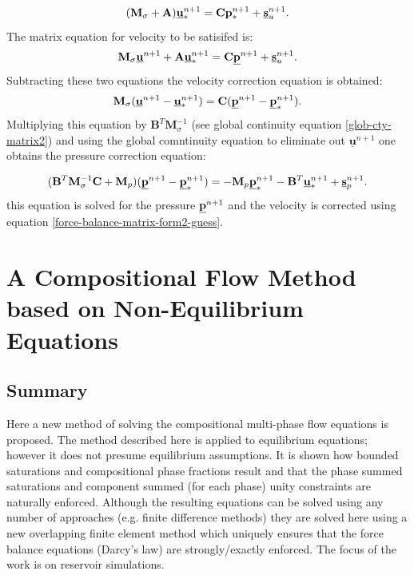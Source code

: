 \begin{equation}
({\mathbf M}_\sigma +{\mathbf A}) \underline{\bf u}^{n+1}_* = {\mathbf C} {\bf p}^{n+1}_* + \underline{\bf s}_u^{n+1}. 
\label{force-balance-matrix-form2-guess}
\end{equation}
The matrix equation for velocity to be satisifed is: 
\begin{equation}
{\mathbf M}_\sigma\underline{\bf u}^{n+1} +{\mathbf A} \underline{\bf u}^{n+1}_* = {\mathbf C} \underline{\bf p}^{n+1} + \underline{\bf s}_u^{n+1}. 
\label{force-balance-matrix-form2-guess-2}
\end{equation}
Subtracting these two equations the   
velocity correction equation is obtained:
\begin{equation}
{\mathbf M}_\sigma ( \underline{\bf u}^{n+1} -\underline{\bf u}^{n+1}_*) 
= {\mathbf C} (\underline{\bf p}^{n+1} - \underline{\bf p}^{n+1}_*). 
\label{force-balance-matrix-form2-guess}
\end{equation}
Multiplying this equation by ${\mathbf B}^T {\mathbf M}_\sigma^{-1}$ 
(see global continuity 
equation \ref{glob-cty-matrix2}) and using the global comntinuity 
equation to eliminate out $ \underline{\mathbf u}^{n+1} $ one obtains 
the pressure correction equation:

\begin{equation}
({\mathbf B}^T {\mathbf M}_\sigma^{-1} {\mathbf C} + {\mathbf M}_p) (\underline{\bf p}^{n+1} - \underline{\bf p}^{n+1}_*) 
= - {\mathbf M}_p \underline{\bf p}^{n+1}_* - {\mathbf B}^T \underline{\bf u}^{n+1}_* + \underline{\bf s}_p^{n+1}.
\end{equation}
this equation is solved for the pressure  $\underline{\bf p}^{n+1}$ and the 
velocity is corrected using equation \ref{force-balance-matrix-form2-guess}.


				


\section{A Compositional Flow 
Method based on Non-Equilibrium 
Equations}
\label{Compositional}

\subsection{Summary}
Here a new method of solving the compositional multi-phase flow 
equations is proposed. The method described here is applied to equilibrium equations; however it does not presume equilibrium assumptions. 
It is shown how bounded saturations and compositional phase fractions 
result and that the phase summed saturations and 
component summed (for each phase) unity constraints are 
naturally enforced. Although the resulting equations can 
be solved using any number of approaches 
(e.g. finite difference methods) they are solved 
here using a new overlapping 
finite element method which uniquely ensures that the force balance 
equations (Darcy's law) are strongly/exactly enforced.  
The focus of the work is on reservoir simulations. 


